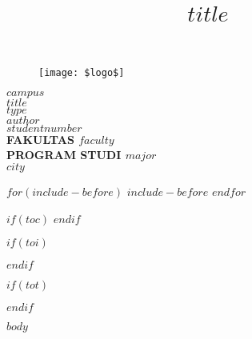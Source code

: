 \documentclass[12pt, a4paper, onecolumn, oneside, final, bahasa]{$documentclass$}
\title{$title$}
\begin{document}
\begin{titlepage}
    \begin{center}
        \begin{figure}
            \begin{center}
                \texttt{[image: \$logo\$]}
            \end{center}
        \end{figure}
        \vspace*{0cm}
        \textbf{$campus$} \\
        \textbf{$title$} \\[1.0cm]
        \vspace*{2.5cm}
        \textbf{$type$} \\
        \vspace*{3 cm}       
        \textbf{$author$} \\
        \textbf{$studentnumber$} \\
        \vspace*{5.0cm}
        \textbf{
            FAKULTAS $faculty$ \\
            PROGRAM STUDI $major$ \\
            $city$
        }
    \end{center}
\end{titlepage}
\setcounter{page}{2}

$for(include-before)$
    $include-before$
$endfor$

$if(toc)$
{
    \hypersetup{linkcolor=black}
    \tableofcontents
}
$endif$

$if(toi)$
    \hypersetup{linkcolor=black}
    \listoffigures
$endif$

$if(tot)$
    \hypersetup{linkcolor=black}
    \listoftables
$endif$


\newpage
{}

$body$
\end{document}
